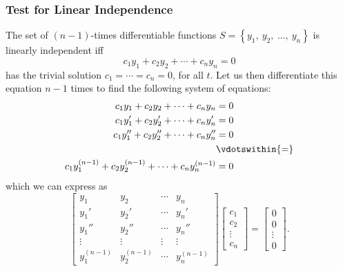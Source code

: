 \documentclass{article}
\begin{document}
\subsubsection{Test for Linear Independence}
The set of \(\left( n-1 \right)\)-times differentiable functions \(S = \left\{ y_1,\: y_2,\: \dots,\: y_n \right\}\) is linearly independent iff
\begin{equation*}
    c_1 y_1 + c_2 y_2 + \cdots + c_n y_n = 0
\end{equation*}
has the trivial solution \(c_1 = \cdots = c_n = 0\), for all \(t\). Let us then differentiate this equation \(n - 1\) times to
find the following system of equations:
\begin{equation*}
    \begin{aligned}
        c_1 y_1 + c_2 y_2 + \cdots + c_n y_n                                                                & = 0             \\
        c_1 y_1' + c_2 y_2' + \cdots + c_n y_n'                                                             & = 0             \\
        c_1 y_1'' + c_2 y_2'' + \cdots + c_n y_n''                                                          & = 0             \\
                                                                                                            & \vdotswithin{=} \\
        c_1 y_1^{\left( n-1 \right)} + c_2 y_2^{\left( n-1 \right)} + \cdots + c_n y_n^{\left( n-1 \right)} & = 0
    \end{aligned}
\end{equation*}
which we can express as
\begin{equation*}
    \begin{bmatrix}
        y_1                      & y_2                      & \cdots & y_n                      \\
        y_1'                     & y_2'                     & \cdots & y_n'                     \\
        y_1''                    & y_2''                    & \cdots & y_n''                    \\
        \vdots                   & \vdots                   & \vdots & \vdots                   \\
        y_1^{\left( n-1 \right)} & y_2^{\left( n-1 \right)} & \cdots & y_n^{\left( n-1 \right)}
    \end{bmatrix}
    \begin{bmatrix}
        c_1    \\
        c_2    \\
        \vdots \\
        c_n
    \end{bmatrix}
    =
    \begin{bmatrix}
        0      \\
        0      \\
        \vdots \\
        0
    \end{bmatrix}.
\end{equation*}
\end{document}
